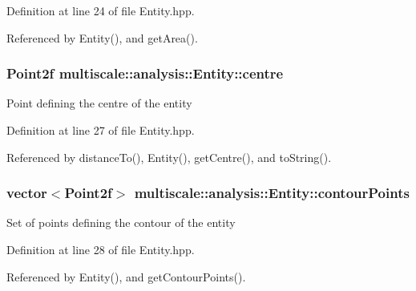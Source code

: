 \-Definition at line 24 of file \-Entity.\-hpp.



\-Referenced by \-Entity(), and get\-Area().

\hypertarget{classmultiscale_1_1analysis_1_1Entity_ad226609174b21f71210161d29a16d4ef}{
\subsubsection[{centre}]{\setlength{\rightskip}{0pt plus 5cm}\-Point2f {\bf multiscale\-::analysis\-::\-Entity\-::centre}}}\label{classmultiscale_1_1analysis_1_1Entity_ad226609174b21f71210161d29a16d4ef}
\-Point defining the centre of the entity 

\-Definition at line 27 of file \-Entity.\-hpp.



\-Referenced by distance\-To(), \-Entity(), get\-Centre(), and to\-String().

\hypertarget{classmultiscale_1_1analysis_1_1Entity_a0199b0a0e5b22809015ecbc23d17785e}{
\subsubsection[{contour\-Points}]{\setlength{\rightskip}{0pt plus 5cm}vector$<$\-Point2f$>$ {\bf multiscale\-::analysis\-::\-Entity\-::contour\-Points}}}\label{classmultiscale_1_1analysis_1_1Entity_a0199b0a0e5b22809015ecbc23d17785e}
\-Set of points defining the contour of the entity 

\-Definition at line 28 of file \-Entity.\-hpp.



\-Referenced by \-Entity(), and get\-Contour\-Points().

